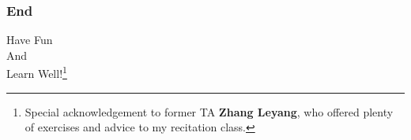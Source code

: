 \documentclass[10pt, t]{beamer}
\begin{document}
\begin{frame}
    \frametitle{End}
    \vspace{2.2cm}
    \begin{center}
        \Large
        Have Fun \\
        And \\
        Learn Well!\footnote[frame]{Special acknowledgement to former TA \textbf{Zhang Leyang}, who offered plenty of exercises and advice to my recitation class.}
    \end{center}
\end{frame}
\end{document}
